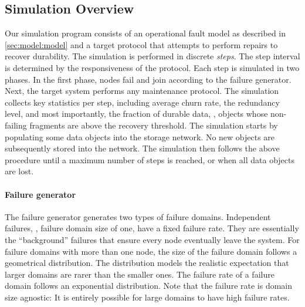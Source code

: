 \subsection{Simulation Overview}

Our simulation program consists of an operational fault model as described in \autoref{sec:model:model} and a target protocol that attempts to perform repairs to recover durability.
The simulation is performed in discrete \emph{steps}.
The step interval is determined by the responsiveness of the protocol.
Each step is simulated in two phases.
In the first phase, nodes fail and join according to the failure generator.
Next, the target system performs any maintenance protocol.
The simulation collects key statistics per step, including average churn rate, the redundancy level, and most importantly, the fraction of durable data, \ie, objects whose non-failing fragments are above the recovery threshold.
The simulation starts by populating some data objects into the storage network.
No new objects are subsequently stored into the network.
The simulation then follows the above procedure until a maximum number of steps is reached, or when all data objects are lost.

\paragraph{Failure generator}
The failure generator generates two types of failure domains.
Independent failures, \ie, failure domain size of one, have a fixed failure rate.
They are essentially the ``background'' failures that ensure every node eventually leave the system.
For failure domains with more than one node, the size of the failure domain follows a geometrical distribution.
The distribution models the realistic expectation that larger domains are rarer than the smaller ones.
The failure rate of a failure domain follows an exponential distribution.
Note that the failure rate is domain size agnostic: It is entirely possible for large domains to have high failure rates.

